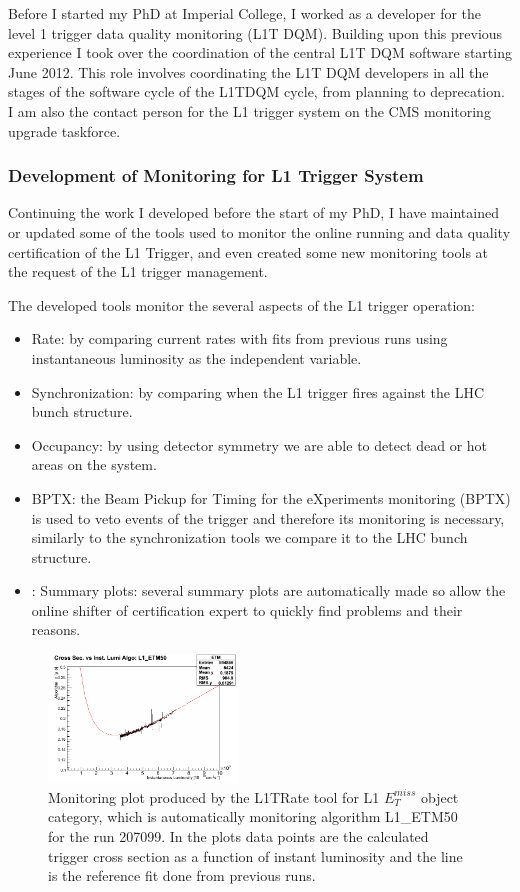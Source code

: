 \documentclass[%
reprint,
amsmath,
amssymb,
aps,
pra,
showkeys
]{revtex4-1}
\begin{document}
Before I started my PhD at Imperial College, I worked as a developer for the level 1 trigger data quality monitoring
(L1T DQM). Building upon this previous experience I took over the coordination of the central L1T DQM software starting
June 2012. This role involves coordinating the L1T DQM developers in all the stages of the software cycle of the L1TDQM
cycle, from planning to deprecation. I am also the contact person for the L1 trigger system on the CMS monitoring 
upgrade taskforce.

\subsubsection{Development of Monitoring for L1 Trigger System}

Continuing the work I developed before the start of my PhD, I have maintained or updated some of the tools
used to monitor the online running and data quality certification of the L1 Trigger, and even created some new 
monitoring tools at the request of the L1 trigger management. 

The developed tools monitor the several aspects of the L1 trigger operation:
\begin{itemize}
  \item Rate: by comparing current rates with fits from previous runs using instantaneous luminosity as the independent
              variable.
  \item Synchronization: by comparing when the L1 trigger fires against the LHC bunch structure.
  \item Occupancy: by using detector symmetry we are able to detect dead or hot areas on the system.
  \item BPTX: the Beam Pickup for Timing for the eXperiments monitoring (BPTX) is used to veto events of the trigger
              and therefore its monitoring is necessary, similarly to the synchronization tools we compare it to 
              the LHC bunch structure.
  \item: Summary plots: several summary plots are automatically made so allow the online shifter of certification 
         expert to quickly find problems and their reasons.
\end{itemize}

\begin{figure}[ht]
\centering
\includegraphics[width=0.45\textwidth]{img/L1TRate_L1_ETM50.png}
\caption{Monitoring plot produced by the L1TRate tool for L1 $E_T^{miss}$ object category, which is automatically
monitoring algorithm L1\_ETM50 for the run 207099. In the plots data points are the calculated trigger cross
section as a function of instant luminosity and the line is the reference fit done from previous runs.}
\label{figure_ServiceWork_L1TRate}
\end{figure}



\end{document}
